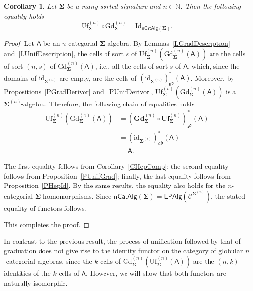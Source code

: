 \documentclass[a4paper, reqno
]{amsart}
\newcommand{\sig}[1]{\mathbf{#1}}             %
\newcommand{\calg}[1]{\boldsymbol{\mathsf{#1}}} %
\newcommand{\spec}[1]{\boldsymbol{\mathcal{#1}}} %
\newcommand{\id}{\mathrm{id}}
\newcommand{\Id}{\mathrm{Id}}
\newcommand{\gd}{\mathfrak{gd}}              %
\newcommand{\Gd}{\mathrm{Gd}}
\newcommand{\Uf}{\mathrm{Uf}}
\newcommand{\bGd}{\mathbf{Gd}}
\newcommand{\bUf}{\mathbf{Uf}}
\theoremstyle{plain}
\newtheorem{corollary}[theorem]{Corollary}
\theoremstyle{definition}
\begin{document}
\begin{corollary}\label{CUnifGrad}
Let $\sig{\Sigma}$ be a many-sorted signature and $n\in\mathbb{N}$.
Then the following equality holds
$$
\Uf^{(n)}_{\sig{\Sigma}}\circ\Gd^{(n)}_{\sig{\Sigma}}=\Id_{\mathsf{nCatAlg}(\sig{\Sigma})}.
$$
\end{corollary}
\begin{proof}
Let $\calg{A}$ be an $n$-categorial $\sig{\Sigma}$-algebra.
By Lemmas~\ref{LGradDescription} and~\ref{LUnifDescription}, the cells of sort $s$ of $\Uf^{(n)}_{\sig{\Sigma}}(\Gd^{(n)}_{\sig{\Sigma}}(\calg{A}))$ are the cells of sort $(n,s)$ of $\Gd^{(n)}_{\sig{\Sigma}}(\calg{A})$, i.e., all the cells of sort $s$ of $\calg{A}$, which, since the domains of $\id_{\sig{\Sigma}^{(n)}}$ are empty, are the cells of $(\id_{\sig{\Sigma}^{(n)}})^{\ast}_{\gd}(\calg{A})$.
Moreover, by Propositions~\ref{PGradDerivor} and~\ref{PUnifDerivor}, $\Uf^{(n)}_{\sig{\Sigma}}(\Gd^{(n)}_{\sig{\Sigma}}(\calg{A}))$ is a $\sig{\Sigma}^{(n)}$-algebra.
Therefore, the following chain of equalities holds
\begin{align*}
\Uf^{(n)}_{\sig{\Sigma}}\left(\Gd^{(n)}_{\sig{\Sigma}}(\calg{A})\right)
&=
\left(\bGd^{(n)}_{\sig{\Sigma}}\circ\bUf^{(n)}_{\sig{\Sigma}}\right)^{\ast}_{\gd}(\calg{A})
\tag{1}
\\&=
\left(\id_{\sig{\Sigma}^{(n)}}\right)^{\ast}_{\gd}(\calg{A})
\tag{2}
\\&=
\calg{A}.
\tag{3}
\end{align*}

The first equality follows from Corollary~\ref{CHepComp}; the second equality follows from Proposition~\ref{PUnifGrad}; finally, the last equality follows from Proposition~\ref{PHepId}.
By the same results, the equality also holds for the $n$-categorial $\sig{\Sigma}$-homomorphisms.
Since $\mathsf{nCatAlg}(\sig{\Sigma})=\mathsf{EPAlg}(\spec{C}^{\sig{\Sigma}^{(n)}})$, the stated equality of functors follows.

This completes the proof.
\end{proof}

In contrast to the previous result, the process of unification followed by that of graduation does not give rise to the identity functor on the category of globular $n$-categorial algebras, since the $k$-cells of $\Gd^{(n)}_{\sig{\Sigma}}(\Uf^{(n)}_{\sig{\Sigma}}(\calg{A}))$ are the $(n,k)$-identities of the $k$-cells of $\calg{A}$.
However, we will show that both functors are naturally isomorphic.
\end{document}
